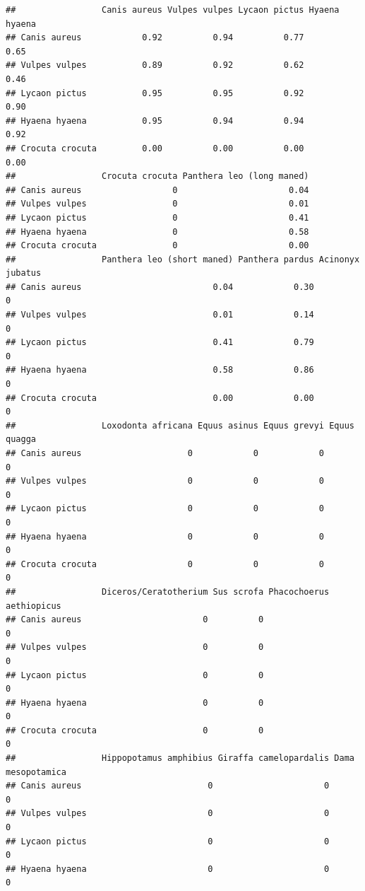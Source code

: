 \documentclass[
]{article}
\begin{document}
\begin{verbatim}
##                 Canis aureus Vulpes vulpes Lycaon pictus Hyaena hyaena
## Canis aureus            0.92          0.94          0.77          0.65
## Vulpes vulpes           0.89          0.92          0.62          0.46
## Lycaon pictus           0.95          0.95          0.92          0.90
## Hyaena hyaena           0.95          0.94          0.94          0.92
## Crocuta crocuta         0.00          0.00          0.00          0.00
##                 Crocuta crocuta Panthera leo (long maned)
## Canis aureus                  0                      0.04
## Vulpes vulpes                 0                      0.01
## Lycaon pictus                 0                      0.41
## Hyaena hyaena                 0                      0.58
## Crocuta crocuta               0                      0.00
##                 Panthera leo (short maned) Panthera pardus Acinonyx jubatus
## Canis aureus                          0.04            0.30                0
## Vulpes vulpes                         0.01            0.14                0
## Lycaon pictus                         0.41            0.79                0
## Hyaena hyaena                         0.58            0.86                0
## Crocuta crocuta                       0.00            0.00                0
##                 Loxodonta africana Equus asinus Equus grevyi Equus quagga
## Canis aureus                     0            0            0            0
## Vulpes vulpes                    0            0            0            0
## Lycaon pictus                    0            0            0            0
## Hyaena hyaena                    0            0            0            0
## Crocuta crocuta                  0            0            0            0
##                 Diceros/Ceratotherium Sus scrofa Phacochoerus aethiopicus
## Canis aureus                        0          0                        0
## Vulpes vulpes                       0          0                        0
## Lycaon pictus                       0          0                        0
## Hyaena hyaena                       0          0                        0
## Crocuta crocuta                     0          0                        0
##                 Hippopotamus amphibius Giraffa camelopardalis Dama mesopotamica
## Canis aureus                         0                      0                 0
## Vulpes vulpes                        0                      0                 0
## Lycaon pictus                        0                      0                 0
## Hyaena hyaena                        0                      0                 0

\end{verbatim}
\end{document}
